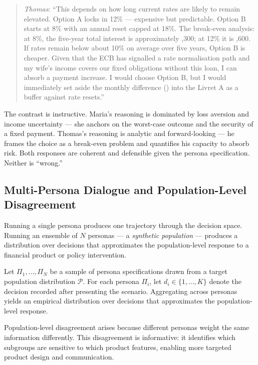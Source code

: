 \begin{context}
\begin{example}
\begin{quote}
\textit{Thomas}: ``This depends on how long current rates are likely to remain elevated. Option A locks in 12\% --- expensive but predictable. Option B starts at 8\% with an annual reset capped at 18\%. The break-even analysis: at 8\%, the five-year total interest is approximately ,300; at 12\% it is ,600. If rates remain below about 10\% on average over five years, Option B is cheaper. Given that the ECB has signalled a rate normalisation path and my wife's income covers our fixed obligations without this loan, I can absorb a payment increase. I would choose Option B, but I would immediately set aside the monthly difference () into the Livret A as a buffer against rate resets.''
\end{quote}
\end{example}

The contrast is instructive. Maria's reasoning is dominated by loss aversion and income uncertainty --- she anchors on the worst-case outcome and the security of a fixed payment. Thomas's reasoning is analytic and forward-looking --- he frames the choice as a break-even problem and quantifies his capacity to absorb risk. Both responses are coherent and defensible given the persona specification. Neither is ``wrong.''

\subsection{Multi-Persona Dialogue and Population-Level Disagreement}
\label{subsec:persona-dialogue}

Running a single persona produces one trajectory through the decision space. Running an ensemble of $N$ personas --- a \emph{synthetic population} --- produces a distribution over decisions that approximates the population-level response to a financial product or policy intervention.

Let $\Pi_1, \ldots, \Pi_N$ be a sample of persona specifications drawn from a target population distribution $\mathcal{P}$. For each persona $\Pi_i$, let $d_i \in \{1, \ldots, K\}$ denote the decision recorded after presenting the scenario. Aggregating across personas yields an empirical distribution over decisions that approximates the population-level response.

Population-level disagreement arises because different personas weight the same information differently. This disagreement is informative: it identifies which subgroups are sensitive to which product features, enabling more targeted product design and communication.


\end{context}
